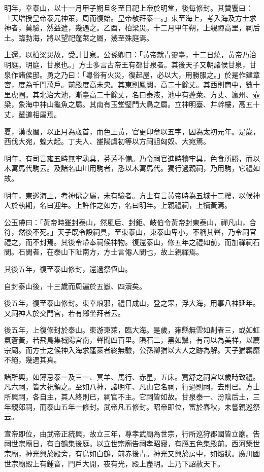 \begin{pinyinscope}
明年，幸泰山，以十一月甲子朔旦冬至日祀上帝於明堂，後每修封。其贊饗曰：「天增授皇帝泰元神策，周而復始。皇帝敬拜泰一。」東至海上，考入海及方士求神者，莫驗，然益遣，幾遇之。乙酉，柏梁災。十二月甲午朔，上親禪高里，祠后土。臨勃海，將以望祀蓬萊之屬，幾至殊庭焉。

上還，以柏梁災故，受計甘泉。公孫卿曰：「黃帝就青靈臺，十二日燒，黃帝乃治明庭。明庭，甘泉也。」方士多言古帝王有都甘泉者。其後天子又朝諸侯甘泉，甘泉作諸侯邸。勇之乃曰：「粵俗有火災，復起屋，必以大，用勝服之。」於是作建章宮，度為千門萬戶。前殿度高未央。其東則鳳闕，高二十餘丈。其西則商中，數十里虎圈。其北治大池，漸臺高二十餘丈，名曰泰液，池中有蓬萊、方丈、瀛州、壺梁，象海中神山龜魚之屬。其南有玉堂璧門大鳥之屬。立神明臺、井幹樓，高五十丈，輦道相屬焉。

夏，漢改曆，以正月為歲首，而色上黃，官更印章以五字，因為太初元年。是歲，西伐大宛，蝗大起。丁夫人、雒陽虞初等以方祠詛匈奴、大宛焉。

明年，有司言雍五畤無牢孰具，芬芳不備。乃令祠官進畤犢牢具，色食所勝，而以木寓馬代駒云。及諸名山川用駒者，悉以木寓馬代。獨行過親祠，乃用駒，它禮如故。

明年，東巡海上，考神僊之屬，未有驗者。方士有言黃帝時為五城十二樓，以候神人於執期，名曰迎年。上許作之如方，名曰明年。上親禮祠，上犢黃焉。

公玉帶曰：「黃帝時雖封泰山，然風后、封鉅、岐伯令黃帝封東泰山，禪凡山，合符，然後不死。」天子既令設祠具，至東泰山，東泰山卑小，不稱其聲，乃令祠官禮之，而不封焉。其後令帶奉祠候神物。復還泰山，修五年之禮如前，而加禪祠石閭。石閭者，在泰山下阯南方，方士言僊人閭也，故上親禪焉。

其後五年，復至泰山修封，還過祭恆山。

自封泰山後，十三歲而周遍於五嶽、四瀆矣。

後五年，復至泰山修封。東幸琅邪，禮日成山，登之罘，浮大海，用事八神延年。又祠神人於交門宮，若有鄉坐拜者云。

後五年，上復修封於泰山。東游東萊，臨大海。是歲，雍縣無雲如剨者三，或如虹氣蒼黃，若飛鳥集棫陽宮南，聲聞四百里。隕石二，黑如黳，有司以為美祥，以薦宗廟。而方士之候神入海求蓬萊者終無驗，公孫卿猶以大人之跡為解。天子猶羈縻不絕，幾遇其真。

諸所興，如薄忌泰一及三一、冥羊、馬行、赤星，五床。寬舒之祠宮以歲時致禮。凡六祠，皆大祝領之。至如八神，諸明年、凡山它名祠，行過則祠，去則已。方士所興祠，各自主，其人終則已，祠官不主。它祠皆如故。甘泉泰一、汾陰后土，三年親郊祠，而泰山五年一修封。武帝凡五修封。昭帝即位，富於春秋，未嘗親巡祭云。

宣帝即位，由武帝正統興，故立三年，尊孝武廟為世宗，行所巡狩郡國皆立廟。告祠世宗廟日，有白鶴集後庭。以立世宗廟告祠孝昭寢，有鴈五色集殿前。西河築世宗廟，神光興於殿旁，有鳥如白鶴，前赤後青。神光又興於房中，如燭狀。廣川國世宗廟殿上有鍾音，門戶大開，夜有光，殿上盡明。上乃下詔赦天下。


\end{pinyinscope}
